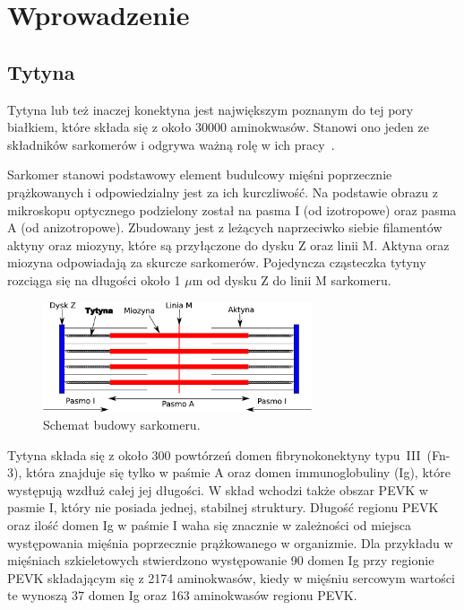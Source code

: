 \chapter{Wprowadzenie}
\section{Tytyna}
Tytyna lub też inaczej konektyna jest największym poznanym do tej pory białkiem, które składa się z około 30000 aminokwasów. Stanowi ono jeden ze składników sarkomerów i odgrywa ważną rolę w ich pracy~\cite{parametry, Maruyama_1997}.

Sarkomer stanowi podstawowy element budulcowy mięśni poprzecznie prążkowanych i odpowiedzialny jest za ich kurczliwość. Na podstawie obrazu z mikroskopu optycznego podzielony został na pasma I (od izotropowe) oraz pasma A (od anizotropowe). Zbudowany jest z leżących naprzeciwko siebie filamentów aktyny oraz miozyny, które są przyłączone do dysku Z oraz linii M. Aktyna oraz miozyna odpowiadają za skurcze sarkomerów. Pojedyncza cząsteczka tytyny rozciąga się na długości około 1 $\mu$m od dysku Z do linii M sarkomeru.\cite{Labeit_1995} 

\begin{figure}[h!]
\begin{centering}
\includegraphics[width=300px]{./rys/sarko.pdf}
\caption{Schemat budowy sarkomeru.}
\end{centering}
\end{figure}

Tytyna składa się z około 300 powtórzeń domen fibrynokonektyny \mbox{typu~III~(Fn-3)}, która znajduje się tylko w paśmie A oraz domen immunoglobuliny (Ig), które występują wzdłuż całej jej długości. W skład wchodzi także obszar PEVK w pasmie I, który nie posiada jednej, stabilnej struktury. Długość regionu PEVK oraz ilość domen Ig w paśmie I waha się znacznie w zależności od miejsca występowania mięśnia poprzecznie prążkowanego w organizmie. Dla przykładu w mięśniach szkieletowych stwierdzono występowanie 90 domen Ig przy regionie PEVK składającym się z 2174 aminokwasów, kiedy w mięśniu sercowym wartości te wynoszą 37 domen Ig oraz 163 aminokwasów regionu PEVK\cite{Labeit_1995}.

